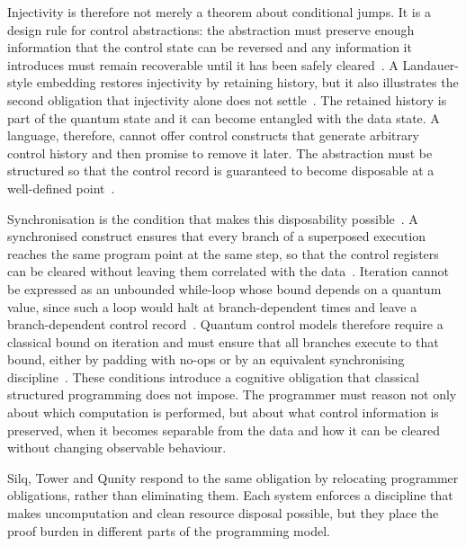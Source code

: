 Injectivity is therefore not merely a theorem about conditional jumps.
It is a design rule for control abstractions: the abstraction must preserve enough information that the control state can be reversed and any information it introduces must remain recoverable until it has been safely cleared~\cite{yuan2025foundationalabstractions}.
A Landauer-style embedding restores injectivity by retaining history, but it also illustrates the second obligation that injectivity alone does not settle~\cite{yuan2025foundationalabstractions}.
The retained history is part of the quantum state and it can become entangled with the data state.
A language, therefore, cannot offer control constructs that generate arbitrary control history and then promise to remove it later.
The abstraction must be structured so that the control record is guaranteed to become disposable at a well-defined point~\cite{yuan2025foundationalabstractions}.

Synchronisation is the condition that makes this disposability possible~\cite{yuan2025foundationalabstractions}.
A synchronised construct ensures that every branch of a superposed execution reaches the same program point at the same step, so that the control registers can be cleared without leaving them correlated with the data~\cite{yuan2025foundationalabstractions}.
Iteration cannot be expressed as an unbounded while-loop whose bound depends on a quantum value, since such a loop would halt at branch-dependent times and leave a branch-dependent control record~\cite{yuan2025foundationalabstractions}.
Quantum control models therefore require a classical bound on iteration and must ensure that all branches execute to that bound, either by padding with no-ops or by an equivalent synchronising discipline~\cite{yuan2025foundationalabstractions}.
These conditions introduce a cognitive obligation that classical structured programming does not impose.
The programmer must reason not only about which computation is performed, but about what control information is preserved, when it becomes separable from the data and how it can be cleared without changing observable behaviour.

Silq, Tower and Qunity respond to the same obligation by relocating programmer obligations, rather than eliminating them.
Each system enforces a discipline that makes uncomputation and clean resource disposal possible, but they place the proof burden in different parts of the programming model.

